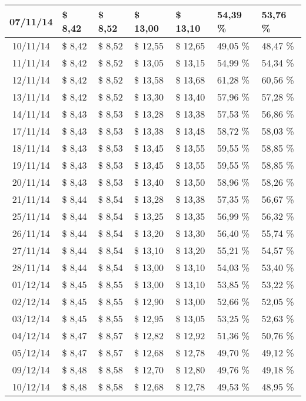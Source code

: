 \begin{center}
\begin{longtable}{|c|p{1.5cm}|p{1.5cm}|p{1.5cm}|p{1.5cm}|p{1.5cm}|p{1.5cm}|}
07/11/14 & \$ 8,42 & \$ 8,52 & \$ 13,00 & \$ 13,10 & 54,39 \% & 53,76 \% \\ \hline
10/11/14 & \$ 8,42 & \$ 8,52 & \$ 12,55 & \$ 12,65 & 49,05 \% & 48,47 \% \\ \hline
11/11/14 & \$ 8,42 & \$ 8,52 & \$ 13,05 & \$ 13,15 & 54,99 \% & 54,34 \% \\ \hline
12/11/14 & \$ 8,42 & \$ 8,52 & \$ 13,58 & \$ 13,68 & 61,28 \% & 60,56 \% \\ \hline
13/11/14 & \$ 8,42 & \$ 8,52 & \$ 13,30 & \$ 13,40 & 57,96 \% & 57,28 \% \\ \hline
14/11/14 & \$ 8,43 & \$ 8,53 & \$ 13,28 & \$ 13,38 & 57,53 \% & 56,86 \% \\ \hline
17/11/14 & \$ 8,43 & \$ 8,53 & \$ 13,38 & \$ 13,48 & 58,72 \% & 58,03 \% \\ \hline
18/11/14 & \$ 8,43 & \$ 8,53 & \$ 13,45 & \$ 13,55 & 59,55 \% & 58,85 \% \\ \hline
19/11/14 & \$ 8,43 & \$ 8,53 & \$ 13,45 & \$ 13,55 & 59,55 \% & 58,85 \% \\ \hline
20/11/14 & \$ 8,43 & \$ 8,53 & \$ 13,40 & \$ 13,50 & 58,96 \% & 58,26 \% \\ \hline
21/11/14 & \$ 8,44 & \$ 8,54 & \$ 13,28 & \$ 13,38 & 57,35 \% & 56,67 \% \\ \hline
25/11/14 & \$ 8,44 & \$ 8,54 & \$ 13,25 & \$ 13,35 & 56,99 \% & 56,32 \% \\ \hline
26/11/14 & \$ 8,44 & \$ 8,54 & \$ 13,20 & \$ 13,30 & 56,40 \% & 55,74 \% \\ \hline
27/11/14 & \$ 8,44 & \$ 8,54 & \$ 13,10 & \$ 13,20 & 55,21 \% & 54,57 \% \\ \hline
28/11/14 & \$ 8,44 & \$ 8,54 & \$ 13,00 & \$ 13,10 & 54,03 \% & 53,40 \% \\ \hline
01/12/14 & \$ 8,45 & \$ 8,55 & \$ 13,00 & \$ 13,10 & 53,85 \% & 53,22 \% \\ \hline
02/12/14 & \$ 8,45 & \$ 8,55 & \$ 12,90 & \$ 13,00 & 52,66 \% & 52,05 \% \\ \hline
03/12/14 & \$ 8,45 & \$ 8,55 & \$ 12,95 & \$ 13,05 & 53,25 \% & 52,63 \% \\ \hline
04/12/14 & \$ 8,47 & \$ 8,57 & \$ 12,82 & \$ 12,92 & 51,36 \% & 50,76 \% \\ \hline
05/12/14 & \$ 8,47 & \$ 8,57 & \$ 12,68 & \$ 12,78 & 49,70 \% & 49,12 \% \\ \hline
09/12/14 & \$ 8,48 & \$ 8,58 & \$ 12,70 & \$ 12,80 & 49,76 \% & 49,18 \% \\ \hline
10/12/14 & \$ 8,48 & \$ 8,58 & \$ 12,68 & \$ 12,78 & 49,53 \% & 48,95 \% \\ \hline

\end{longtable}
\end{center}
